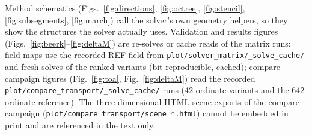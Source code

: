 \documentclass[11pt,a4paper]{article}
\begin{document}
Method schematics (Figs.~\ref{fig:directions}, \ref{fig:octree},
\ref{fig:stencil}, \ref{fig:subsegments}, \ref{fig:march}) call the
solver's own geometry helpers, so they show the structures the solver
actually uses. Validation and results figures
(Figs.~\ref{fig:beerk}--\ref{fig:deltaM}) are re-solves or cache reads of
the matrix runs: field maps use the recorded REF field from
\texttt{plot/solver\_matrix/\_solve\_cache/} and fresh solves of the
ranked variants (bit-reproducible, cached); compare-campaign figures
(Fig.~\ref{fig:toa}, Fig.~\ref{fig:deltaM}) read the recorded
\texttt{plot/compare\_transport/\_solve\_cache/} runs (42-ordinate
variants and the 642-ordinate reference). The three-dimensional HTML
scene exports of the compare campaign
(\texttt{plot/compare\_transport/scene\_*.html}) cannot be embedded in
print and are referenced in the text only.
\end{document}
